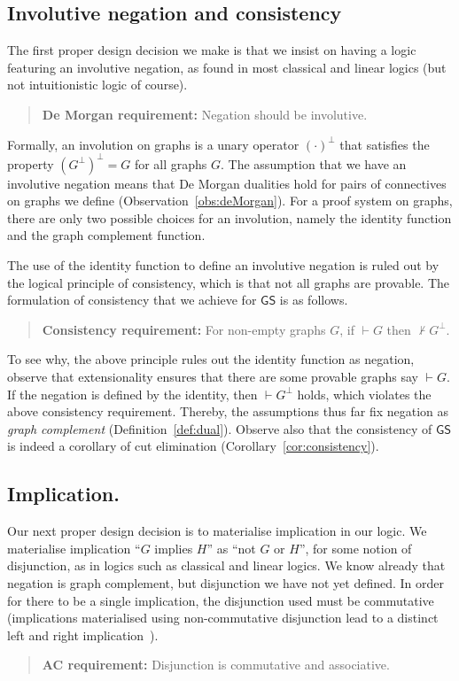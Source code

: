 \documentclass{lmcs} %
\def\GS{\mathsf{GS}}
\def\cneg#1{{#1^\bot}}
\def\gG{G}
\def\gH{H}
\theoremstyle{plain}
\begin{document}
\subsection*{Involutive negation and consistency}
The first proper design decision we make is that we insist on having a logic featuring an involutive negation, as found in most classical and linear logics (but not intuitionistic logic of course).
\begin{quote}
	\textbf{De Morgan requirement:} Negation should be involutive.
\end{quote}
Formally, an involution on graphs is a unary operator $\cneg{\left(\cdot\right)}$ that satisfies the property $\cneg{(\cneg{\gG})} = \gG$ for all graphs $\gG$. 
The assumption that we have an involutive negation means that De Morgan dualities hold for pairs of connectives on graphs we define (Observation~\ref{obs:deMorgan}).
For a proof system on  graphs, there are only two possible choices for an involution, namely the identity function and the graph complement function.


The use of the identity function to define an involutive negation is ruled out by the logical principle of consistency, which is that not all graphs are provable.
The formulation of consistency that we achieve for $\GS$ is as follows.
\begin{quote}
	\textbf{Consistency requirement:} For non-empty graphs $\gG$, if $\vdash \gG$ then $\not\vdash \cneg{\gG}$.
\end{quote}
To see why, the above principle rules out the identity function as negation, observe that extensionality ensures that there are some provable graphs say $\vdash \gG$. 
If the negation is defined by the identity, then $\vdash \cneg\gG$ holds, which violates the above consistency requirement.
Thereby, the assumptions thus far fix negation as \textit{graph complement} (Definition~\ref{def:dual}).
Observe also that the consistency of $\GS$ is indeed a corollary of cut elimination (Corollary~\ref{cor:consistency}).



\subsection*{Implication.}

Our next proper design decision is to materialise implication in our logic. We materialise implication ``$\gG$ implies $\gH$''
as ``not $\gG$ or $\gH$'', for some notion of disjunction, as in logics such as classical and linear logics.
We know already that negation is graph complement, but disjunction we have not yet defined.
In order for there to be a single implication, the disjunction used must be commutative (implications materialised using non-commutative  disjunction lead to a distinct left and right implication~\cite{Lambek1961}).
\begin{quote}
	\textbf{AC requirement:} Disjunction is commutative and associative.
\end{quote}
\end{document}
